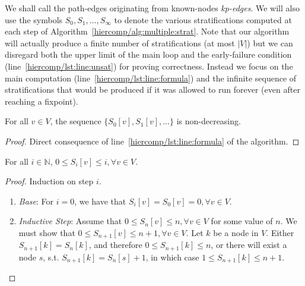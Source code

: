\label{hiercomp/correctness}

We shall call the path-edges originating from known-nodes
\emph{\emph{kp}-edges}.  We will also use the symbols $S_0,
S_1,\ldots,S_\infty$ to denote the various stratifications computed at
each step of Algorithm~\ref{hiercomp/alg:multiple:strat}.  Note that our
algorithm will actually produce a finite number of stratifications (at
most $|V|$) but we can disregard both the upper limit of the main loop
and the early-failure condition (line~\ref{hiercomp/lst:line:unsat}) for
proving correctness. Instead we focus on the main computation
(line~\ref{hiercomp/lst:line:formula}) and the infinite sequence of
stratifications that would be produced if it was allowed to run
forever (even after reaching a fixpoint).

\begin{lem}\label{hiercomp/monotonicity}
  For all $v \in V$, the sequence $\{ S_{0}[v], S_{1}[v], \ldots \}$
  is non-decreasing.
\end{lem}
\begin{proof}
  Direct consequence of line~\ref{hiercomp/lst:line:formula} of the algorithm.
\end{proof}

\begin{lem}\label{hiercomp/range}
  For all $i \in \mathbb{N}$, $0 \leq S_i[v] \leq i, \forall v \in V$.
\end{lem}

\begin{proof}
  Induction on step $i$.

  \begin{enumerate}
  \item \emph{Base}: For $i = 0$, we have that $S_i[v] = S_0[v] = 0, \forall v
    \in V$.
  \item \emph{Inductive Step}: Assume that $0 \leq S_n[v] \leq n,
    \forall v \in V$ for some value of $n$. We must show that $0 \leq
    S_{n+1}[v] \leq n + 1, \forall v \in V$. Let $k$ be a node in $V$.
    Either $S_{n+1}[k] = S_{n}[k]$, and therefore $0 \leq S_{n+1}[k] \leq
    n$, or there will exist a node $s$, s.t. $S_{n+1}[k] = S_{n}[s] +
    1$, in which case $1 \leq S_{n+1}[k] \leq n + 1$.
  \end{enumerate}
\end{proof}

